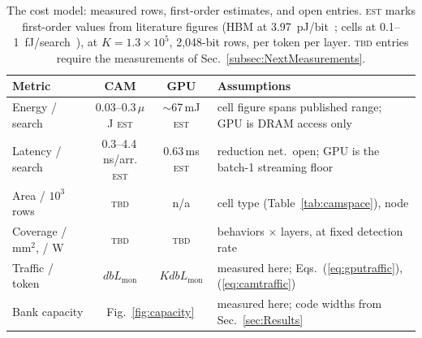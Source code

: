 \begin{table}[t]
\centering
\caption{The cost model: measured rows, first-order estimates, and open
entries. \textsc{est} marks first-order values from literature figures
(HBM at 3.97~pJ/bit~\cite{oconnor2017fgdram}; \cam cells at
0.1--1~fJ/search~\cite{pagiamtzis2006cam,ni2019fetcam,liu2022evacam}),
at $K=1.3\!\times\!10^{5}$, 2{,}048-bit rows, per token per layer.
\textsc{tbd} entries require the measurements of
Sec.~\ref{subsec:NextMeasurements}.}
\label{tab:costmodel}
{\scriptsize\setlength{\tabcolsep}{3pt}
\begin{tabular}{@{}lccp{}@{}}
\toprule
\textbf{Metric} & \textbf{CAM} & \textbf{GPU} & \textbf{Assumptions} \\
\midrule
Energy / search & \makecell[l]{0.03--0.3\,$\mu$J\\\textsc{est}} &
  \makecell[l]{$\sim$67\,mJ\\\textsc{est}} &
  cell figure spans published range; GPU is DRAM access only \\
Latency / search & \makecell[l]{0.3--4.4\,ns/arr.\\\textsc{est}} &
  \makecell[l]{0.63\,ms\\\textsc{est}} &
  reduction net.\ open; GPU is the batch-1 streaming floor \\
Area / $10^{3}$ rows & \textsc{tbd} & n/a &
  cell type (Table~\ref{tab:camspace}), node \\
Coverage / mm$^{2}$, / W & \textsc{tbd} & \textsc{tbd} &
  behaviors $\times$ layers, at fixed detection rate \\
Traffic / token & $d b L_{\mathrm{mon}}$ & $K d b L_{\mathrm{mon}}$ &
  measured here; Eqs.~(\ref{eq:gputraffic}), (\ref{eq:camtraffic}) \\
Bank capacity & \multicolumn{2}{c}{Fig.~\ref{fig:capacity}} &
  measured here; code widths from Sec.~\ref{sec:Results} \\
\bottomrule
\end{tabular}}
\end{table}

